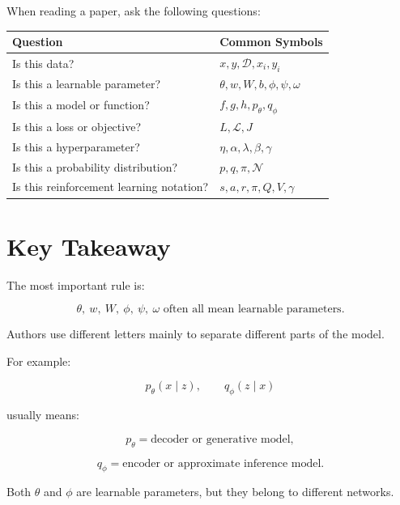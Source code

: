 \documentclass{article}
\begin{document}
When reading a paper, ask the following questions:

\begin{center}
\begin{tabular}{p{5cm} p{8cm}}
\toprule
\textbf{Question} & \textbf{Common Symbols} \\
\midrule
Is this data? & $x, y, \mathcal{D}, x_i, y_i$ \\

Is this a learnable parameter? & $\theta, w, W, b, \phi, \psi, \omega$ \\

Is this a model or function? & $f, g, h, p_\theta, q_\phi$ \\

Is this a loss or objective? & $L, \mathcal{L}, J$ \\

Is this a hyperparameter? & $\eta, \alpha, \lambda, \beta, \gamma$ \\

Is this a probability distribution? & $p, q, \pi, \mathcal{N}$ \\

Is this reinforcement learning notation? & $s, a, r, \pi, Q, V, \gamma$ \\
\bottomrule
\end{tabular}
\end{center}

\section*{Key Takeaway}

The most important rule is:

\[
\boxed{
\theta,\ w,\ W,\ \phi,\ \psi,\ \omega
\text{ often all mean learnable parameters.}
}
\]

Authors use different letters mainly to separate different parts of the model.

For example:

\[
p_\theta(x \mid z),
\qquad
q_\phi(z \mid x)
\]

usually means:

\[
p_\theta
=
\text{decoder or generative model},
\]

\[
q_\phi
=
\text{encoder or approximate inference model}.
\]

Both $\theta$ and $\phi$ are learnable parameters, but they belong to different networks.
\end{document}
